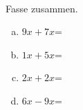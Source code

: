 \begin{aufgabe} ~ \\ 
Fasse zusammen.\begin{multicols}{2} 
\begin{enumerate}[a)] 
\item 
$9x+7x$=
\item 
$1x+5x$=
\item 
$2x+2x$=
\item 
$6x-9x$=
\end{enumerate} 
\end{multicols} 
\end{aufgabe} 
